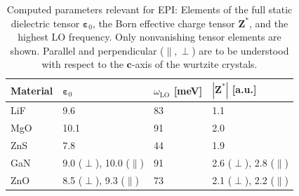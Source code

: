 \begin{table}[t]
\captionsetup{format=plain}
\caption[Computed parameters relevant for EPI.]{Computed parameters relevant for EPI: Elements of the full static dielectric tensor  $\boldsymbol{\varepsilon}_0$, the Born effective charge tensor $\mathbf{Z}^*$, and the highest LO frequency. Only nonvanishing tensor elements are shown.  Parallel and perpendicular ($\parallel,\perp$) are to be understood with respect to the $\mathbf{c}$-axis of the wurtzite crystals.}
\vspace{1mm}
   \begin{tabularx}{\textwidth}{YYYY}
    \hline
    \hline
    Material  & $\boldsymbol{\varepsilon}_0$ & $\omega^{\phantom{I}}_\text{LO}$ [meV] & $|\mathbf{Z}^*|$ [a.u.] \\
    \hline
    LiF  & 9.6  & 83  & 1.1  \\
    MgO  & 10.1 & 91  & 2.0 \\
    ZnS  & 7.8  & 44  & 1.9 \\
    GaN  & 9.0 ($\perp$), 10.0 ($\parallel$)  & 91  & 2.6 ($\perp$), 2.8 ($\parallel$) \\
    ZnO  & 8.5 ($\perp$), 9.3 ($\parallel$)  & 73  & 2.1 ($\perp$), 2.2 ($\parallel$)\\
    \hline
    \hline
    \end{tabularx}
\label{tab_comp_par}
\end{table}

\vfill
